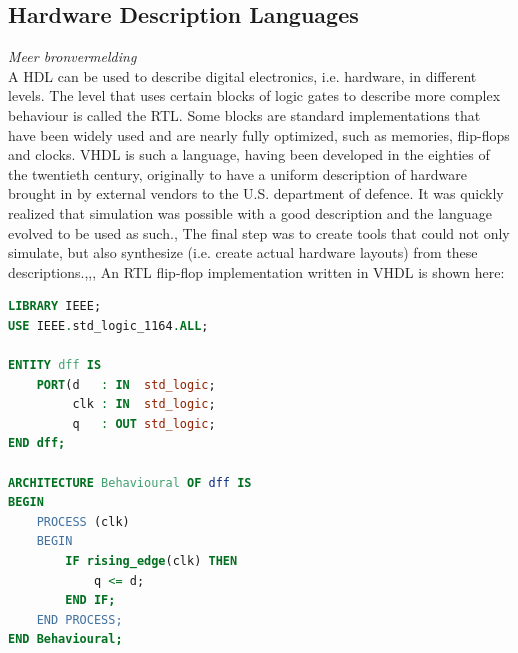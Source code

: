 \documentclass[11pt,british]{article}
\begin{document}
%

\subsection{Hardware Description Languages}
\label{subsec:HDL}
\emph{\color{red}Meer bronvermelding}\\
A \gls{HDL} can be used to describe digital electronics, i.e. hardware, in different levels. The level that uses certain blocks of logic gates to describe more complex behaviour is called the \gls{RTL}. Some blocks are standard implementations that have been widely used and are nearly fully optimized, such as memories, flip-flops and clocks. \gls{VHDL} is such a language, having been developed in the eighties of the twentieth century, originally to have a uniform description of hardware brought in by external vendors to the U.S. department of defence. It was quickly realized that simulation was possible with a good description and the language evolved to be used as such.\cite{vhdlorigin},\cite{vhdlorigin2} The final step was to create tools that could not only simulate, but also synthesize (i.e. create actual hardware layouts) from these descriptions.\cite{vhdlsim},\cite{vhdlsynth},\cite{vhdlsynth2},\cite{vhdlsynth3} An \gls{RTL} flip-flop implementation written in \gls{VHDL} is shown here: 
\begin{lstlisting}[language=VHDL, tabsize=4, frame=single, framesep=2mm, belowskip=16pt, aboveskip=16pt, showstringspaces=false, basicstyle=\footnotesize]
LIBRARY IEEE;
USE IEEE.std_logic_1164.ALL;

ENTITY dff IS
	PORT(d 	 : IN  std_logic;
		 clk : IN  std_logic;
		 q 	 : OUT std_logic;
END dff;

ARCHITECTURE Behavioural OF dff IS
BEGIN
	PROCESS (clk)
	BEGIN
		IF rising_edge(clk) THEN
			q <= d;
		END IF;
	END PROCESS;
END Behavioural;
\end{lstlisting}
\end{document}
